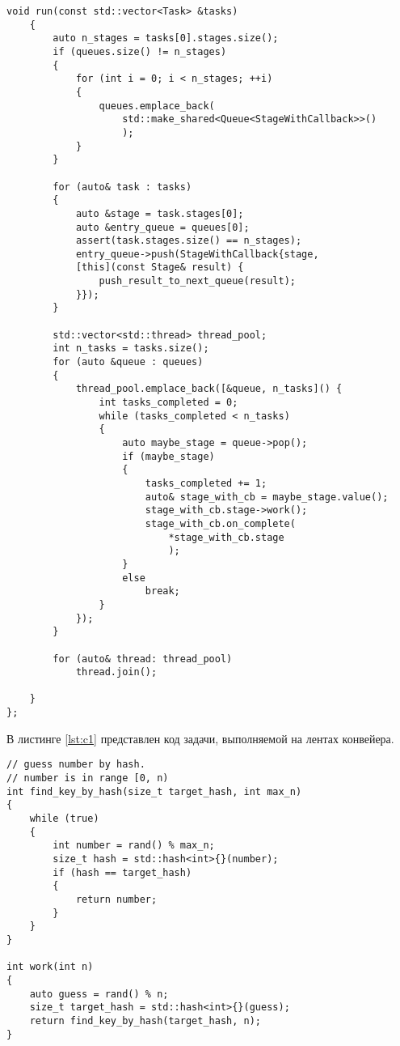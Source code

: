 \begin{lstlisting}[label=lst:potok,caption=Реализация конвейера]
    void run(const std::vector<Task> &tasks)
    {
        auto n_stages = tasks[0].stages.size();
        if (queues.size() != n_stages)
        {
            for (int i = 0; i < n_stages; ++i)
            {
                queues.emplace_back(
					std::make_shared<Queue<StageWithCallback>>()
					);
            }
        }

        for (auto& task : tasks)
        {
            auto &stage = task.stages[0];
            auto &entry_queue = queues[0];
            assert(task.stages.size() == n_stages);
            entry_queue->push(StageWithCallback{stage,
            [this](const Stage& result) {
                push_result_to_next_queue(result);
            }});
        }

        std::vector<std::thread> thread_pool;
        int n_tasks = tasks.size();
        for (auto &queue : queues)
        {
            thread_pool.emplace_back([&queue, n_tasks]() {
                int tasks_completed = 0;
                while (tasks_completed < n_tasks)
                {
                    auto maybe_stage = queue->pop();
                    if (maybe_stage)
                    {
                        tasks_completed += 1;
                        auto& stage_with_cb = maybe_stage.value();
                        stage_with_cb.stage->work();
                        stage_with_cb.on_complete(
							*stage_with_cb.stage
							);
                    }
                    else
                        break;
                }
            });
        }

        for (auto& thread: thread_pool)
            thread.join();

    }
};

\end{lstlisting}

В листинге \ref{lst:c1} представлен код задачи, выполняемой на лентах конвейера.

\begin{lstlisting}[label=lst:c1,caption=Код задачи, выполняемой на лентах конвейера]
// guess number by hash.
// number is in range [0, n)
int find_key_by_hash(size_t target_hash, int max_n)
{
	while (true)
	{
		int number = rand() % max_n;
		size_t hash = std::hash<int>{}(number);
		if (hash == target_hash)
		{
			return number;
		}
	}
}

int work(int n)
{
	auto guess = rand() % n;
	size_t target_hash = std::hash<int>{}(guess);
	return find_key_by_hash(target_hash, n);
}
\end{lstlisting}
\captionsetup{singlelinecheck = false, justification=centering}

